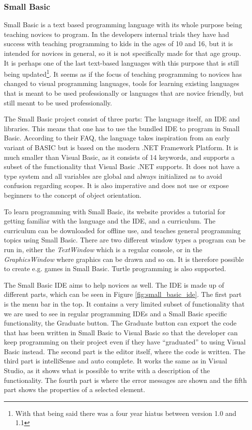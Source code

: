 \subsubsection{Small Basic}
Small Basic is a text based programming language with its whole purpose being teaching novices to program. In the developers internal trials they have had success with teaching programming to kids in the ages of 10 and 16, but it is intended for novices in general, so it is not specifically made for that age group\cite{smallbasic_faq}. It is perhaps one of the last text-based languages with this purpose that is still being updated\footnote{With that being said there was a four year hiatus between version 1.0 and 1.1}. It seems as if the focus of teaching programming to novices has changed to visual programming languages, tools for learning existing languages that is meant to be used professionally or languages that are novice friendly, but still meant to be used professionally.

The Small Basic project consist of three parts: The language itself, an IDE and libraries. This means that one has to use the bundled IDE to program in Small Basic. According to their FAQ\cite{smallbasic_faq}, the language takes inspiration from an early variant of BASIC but is based on the modern .NET Framework Platform. It is much smaller than Visual Basic, as it consists of 14 keywords, and supports a subset of the functionality that Visual Basic .NET supports. It does not have a type system and all variables are global and always initialized as to avoid confusion regarding scopes. It is also imperative and does not use or expose beginners to the concept of object orientation.

To learn programming with Small Basic, its website provides a tutorial for getting familiar with the language and the IDE\cite{smallbasic_intro}, and a curriculum. The curriculum can be downloaded for offline use, and teaches general programming topics using Small Basic\cite{smallbasic_curriculum}. There are two different window types a program can be run in, either the \emph{TextWindow} which is a regular console, or in the \emph{GraphicsWindow} where graphics can be drawn and so on. It is therefore possible to create e.g. games in Small Basic. Turtle programming is also supported.

The Small Basic IDE aims to help novices as well. The IDE is made up of different parts, which can be seen in Figure \ref{fig:small_basic_ide}. The first part is the menu bar in the top. It contains a very limited subset of functionality that we are used to see in regular programming IDEs and a Small Basic specific functionality, the Graduate button. The Graduate button can export the code that has been written in Small Basic to Visual Basic so that the developer can keep programming on their project even if they have ``graduated'' to using Visual Basic instead. The second part is the editor itself, where the code is written. The third part is intelliSense and auto complete. It works the same as in Visual Studio, as it shows what is possible to write with a description of the functionality. The fourth part is where the error messages are shown and the fifth part shows the properties of a selected element.

